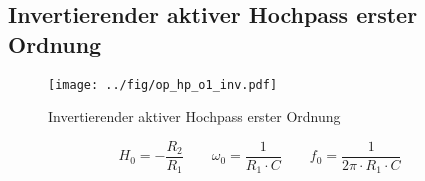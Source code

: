 



\subsection{Invertierender aktiver Hochpass erster Ordnung}
\label{filt:o1-hp}
\begin{figure}[h!]
	\centering
	\texttt{[image: ../fig/op\_hp\_o1\_inv.pdf]}
	\caption{Invertierender aktiver Hochpass erster Ordnung}
	\label{sch:op-hp-o1-inv}
\end{figure}
\[ H_0 = - \frac{R_2}{R_1} \qquad
\omega_0 = \frac{1}{R_1 \cdot C} \qquad
f_0 = \frac{1}{2 \pi \cdot R_1 \cdot C} \]